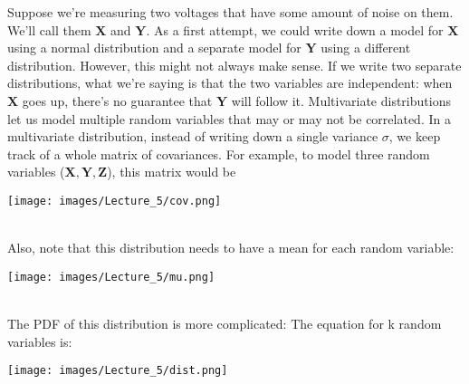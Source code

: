     Suppose we're measuring two voltages that have some amount of noise on them.
    We'll call them $\mathbf{X}$ and $\mathbf{Y}$. As a first attempt, we could
    write down a model for $\mathbf{X}$ using a normal distribution and a
    separate model for $\mathbf{Y}$ using a different distribution. However,
    this might not always make sense. If we write two separate distributions,
    what we're saying is that the two variables are independent: when
    $\mathbf{X}$ goes up, there's no guarantee that $\mathbf{Y}$ will follow it.
    Multivariate distributions let us model multiple random variables that may
    or may not be correlated. In a multivariate distribution, instead of writing
    down a single variance $\sigma$, we keep track of a whole matrix of
    covariances. For example, to model three random variables ($\mathbf{X},
    \mathbf{Y}, \mathbf{Z}$), this matrix would be\\
    
    \begin{minipage}{\linewidth}
      \centering
      \texttt{[image: images/Lecture\_5/cov.png]}
      \end{minipage}\\
      
      
    Also, note that this distribution needs to have a mean for each random
    variable:\\
    
       \begin{minipage}{\linewidth}
      \centering
      \texttt{[image: images/Lecture\_5/mu.png]}
      \end{minipage}\\
      
      
    The PDF of this distribution is more complicated: The equation for k random
    variables is:\\
    
     \begin{minipage}{\linewidth}
      \centering
      \texttt{[image: images/Lecture\_5/dist.png]}
      \end{minipage}

